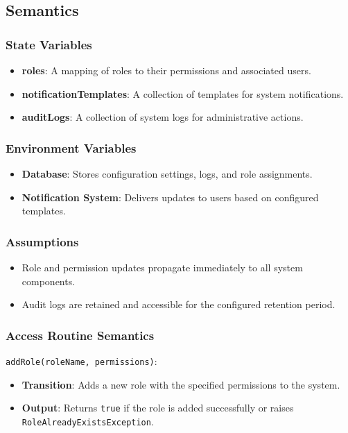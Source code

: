 \documentclass[12pt, titlepage]{article}
\begin{document}
\subsection{Semantics}

\subsubsection{State Variables}
\begin{itemize}
    \item \textbf{roles}: A mapping of roles to their permissions and associated users.
    \item \textbf{notificationTemplates}: A collection of templates for system notifications.
    \item \textbf{auditLogs}: A collection of system logs for administrative actions.
\end{itemize}

\subsubsection{Environment Variables}
\begin{itemize}
    \item \textbf{Database}: Stores configuration settings, logs, and role assignments.
    \item \textbf{Notification System}: Delivers updates to users based on configured templates.
\end{itemize}

\subsubsection{Assumptions}
\begin{itemize}
    \item Role and permission updates propagate immediately to all system components.
    \item Audit logs are retained and accessible for the configured retention period.
\end{itemize}

\subsubsection{Access Routine Semantics}

\noindent \texttt{addRole(roleName, permissions)}:
\begin{itemize}
    \item \textbf{Transition}: Adds a new role with the specified permissions to the system.
    \item \textbf{Output}: Returns \texttt{true} if the role is added successfully or raises \texttt{RoleAlreadyExistsException}.
\end{itemize}
\end{document}
